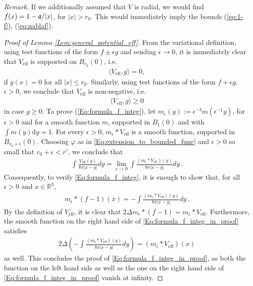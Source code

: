 \documentclass[a4paper,11pt]{article}
\def\bR{\mathbb{R}}
\numberwithin{equation}{section}
\begin{document}
{\it Remark.} If we additionally assumed that $V$ is radial, we would find $f(x) = 1 - \frak{a} / |x|$, for $|x| > r_0$. This would immediately imply the bounds (\ref{eq:1-f}), (\ref{eq:nablaf}). 

\begin{proof}[Proof of Lemma \ref{Lem:general_potential_eff}]
From the variational definition, using test functions of the form $f\pm \epsilon g$ and sending $\epsilon\rightarrow 0$, it is immediately clear that $V_\mathrm{eff}$ is supported on $B_{r_0}(0)$, i.e.
\begin{align}
\label{Eq:Scattering_I}
    \langle V_\mathrm{eff}, g\rangle=0,
\end{align}
if $g(x)=0$ for all $|x|\leq r_0$. Similarly, using test functions of the form $f+ \epsilon g$, $\epsilon > 0$, we conclude that $V_\mathrm{eff}$ is non-negative, i.e.
\begin{align*}
     \langle V_\mathrm{eff}, g\rangle\geq 0
\end{align*}
in case $g\geq 0$. To prove (\ref{Eq:formula_f_integ}), let $m_\epsilon(y):=\epsilon^{-3}m(\epsilon^{-1} y)$, for $\epsilon > 0$ and for a smooth function $m$, supported in $B_1 (0)$ and with $\int m(y) \mathrm{d}y=1$. For every $\epsilon > 0$, $m_\epsilon * V_\text{eff}$ is a smooth function, supported in $B_{r_0+\epsilon} (0)$. Choosing $\varphi$ as in \eqref{Eq:extension_to_bounded_func} and $\epsilon > 0$ so small that $r_0 + \epsilon < r'$, we conclude that 
\begin{align*}
    \int \frac{V_\mathrm{eff}(y)}{8\pi |x-y|} dy=\lim_{\epsilon\rightarrow 0}\int \frac{(m_\epsilon* V_\mathrm{eff})(y)}{8\pi |x-y|} dy \,.
\end{align*}
Consequently, to verify \eqref{Eq:formula_f_integ}, it is enough to show that, for all $\epsilon>0$ and $x \in \bR^3$,
\begin{align}
\label{Eq:formula_f_integ_in_proof}
    m_\epsilon*(f-1) (x) =-\int \frac{(m_\epsilon* V_\mathrm{eff})(y)}{8\pi |x-y|} dy \,.
\end{align}
By the definition of $V_\mathrm{eff}$, it is clear that $2\Delta m_\epsilon*(f-1) = m_\epsilon * V_\mathrm{eff}$. Furthermore, the smooth function on the right hand side of \eqref{Eq:formula_f_integ_in_proof} satisfies 
\begin{align*}
    2\Delta \left(-\int \frac{(m_\epsilon* V_\mathrm{eff})(y)}{8\pi |x-y|} dy\right)= (m_\epsilon * V_\mathrm{eff}) (x)
\end{align*}
as well. This concludes the proof of \eqref{Eq:formula_f_integ_in_proof}, as both the function on the left hand side as well as the one on the right hand side of \eqref{Eq:formula_f_integ_in_proof} vanish at infinity.  


\end{proof}
\end{document}
